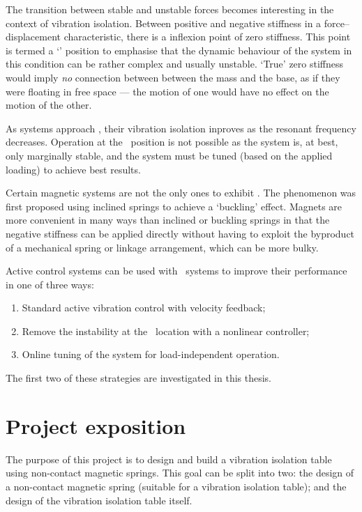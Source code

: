 The transition between stable and unstable forces becomes interesting in the context of vibration isolation. Between positive and negative stiffness in a force--displacement characteristic, there is a inflexion point of zero stiffness. This point is termed a `\qzs' position to emphasise that the dynamic behaviour of the system in this condition can be rather complex and usually unstable. `True' zero stiffness would imply \emph{no} connection between between the mass and the base, as if they were floating in free space — the motion of one would have no effect on the motion of the other.

As systems approach \qzs, their vibration isolation inproves as the resonant frequency decreases. Operation at the \qzs\ position is not possible as the system is, at best, only marginally stable, and the system must be tuned (based on the applied loading) to achieve best results.

Certain magnetic systems are not the only ones to exhibit \qzs. The phenomenon was first proposed using inclined springs to achieve a `buckling' effect. Magnets are more convenient in many ways than inclined or buckling springs in that the negative stiffness can be applied directly without having to exploit the byproduct of a mechanical spring or linkage arrangement, which can be more bulky.

Active control systems can be used with \qzs\ systems to improve their performance in one of three ways:
\begin{enumerate}
  \item Standard active vibration control with velocity feedback;
  \item Remove the instability at the \qzs\ location with a nonlinear controller;
  \item Online tuning of the system for load-independent operation.
\end{enumerate}
The first two of these strategies are investigated in this thesis.

\section{Project exposition}

The purpose of this project is to design and build a vibration
isolation table using non-contact magnetic springs. This goal can be
split into two: the design of a non-contact magnetic spring (suitable
for a vibration isolation table); and the design of the vibration
isolation table itself.

